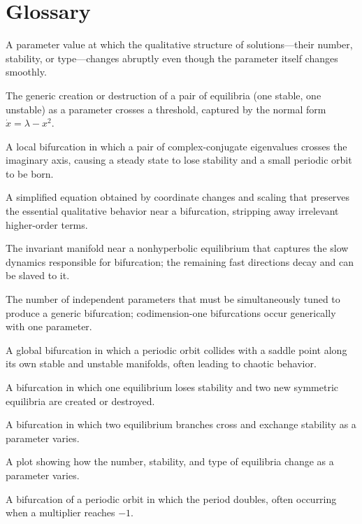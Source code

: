 \section*{Glossary}
\begin{description}[leftmargin=*,style=nextline,itemsep=0.3em]

\item[\textbf{Bifurcation.}] A parameter value at which the qualitative structure of solutions---their number, stability, or type---changes abruptly even though the parameter itself changes smoothly.

\item[\textbf{Saddle-node bifurcation.}] The generic creation or destruction of a pair of equilibria (one stable, one unstable) as a parameter crosses a threshold, captured by the normal form $\dot x=\lambda-x^2$.

\item[\textbf{Hopf bifurcation.}] A local bifurcation in which a pair of complex-conjugate eigenvalues crosses the imaginary axis, causing a steady state to lose stability and a small periodic orbit to be born.

\item[\textbf{Normal form.}] A simplified equation obtained by coordinate changes and scaling that preserves the essential qualitative behavior near a bifurcation, stripping away irrelevant higher-order terms.

\item[\textbf{Center manifold.}] The invariant manifold near a nonhyperbolic equilibrium that captures the slow dynamics responsible for bifurcation; the remaining fast directions decay and can be slaved to it.

\item[\textbf{Codimension.}] The number of independent parameters that must be simultaneously tuned to produce a generic bifurcation; codimension-one bifurcations occur generically with one parameter.

\item[\textbf{Homoclinic bifurcation.}] A global bifurcation in which a periodic orbit collides with a saddle point along its own stable and unstable manifolds, often leading to chaotic behavior.

\item[\textbf{Pitchfork bifurcation.}] A bifurcation in which one equilibrium loses stability and two new symmetric equilibria are created or destroyed.

\item[\textbf{Transcritical bifurcation.}] A bifurcation in which two equilibrium branches cross and exchange stability as a parameter varies.

\item[\textbf{Bifurcation diagram.}] A plot showing how the number, stability, and type of equilibria change as a parameter varies.

\item[\textbf{Period doubling.}] A bifurcation of a periodic orbit in which the period doubles, often occurring when a multiplier reaches $-1$.

\end{description}

